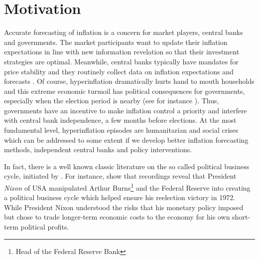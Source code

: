 \documentclass[12pt]{article}
\newcommand{\1}{\mathbbm 1}
\begin{document}
		\vspace{-8ex}
		
		
		
		\tableofcontents
		
		\newpage{}
		
		\vspace{-8ex}
		
		
		
		
		\section{Motivation}
		
		Accurate forecasting of inflation is a concern for market players, central banks and governments. The market participants want to update their inflation expectations in line with new information revelation so that their investment strategies are optimal. Meanwhile, central banks typically have mandates for price stability and they routinely collect data on inflation expectations and forecasts \cite{cukierman1992measuring}. Of course, hyperinflation dramatically hurts hand to mouth households and this extreme economic turmoil has political consequences for governments, especially when the election period is nearby (see for instance \cite{binder2021political}). Thus, governments have an incentive to make inflation control a priority and interfere with central bank independence, a few months before elections. At the most fundamental level, hyperinflation episodes are humanitarian and social crises which can be addressed to some extent if we develop better inflation forecasting methods, independent central banks and policy interventions.
		
		In fact, there is a well known classic literature on the so called political business cycle, initiated by \cite{nordhaus1975political}. For instance, \cite{abrams2012political} show that recordings reveal that President \textit{Nixon} of USA manipulated Arthur Burns\footnote{Head of the Federal Reserve Bank} and the Federal Reserve into creating a political business cycle which helped ensure his reelection victory in 1972. While President Nixon understood the risks that his monetary policy imposed but chose to trade longer-term economic costs to the economy for his own short-term political profits. 
		
		
		
\end{document}

